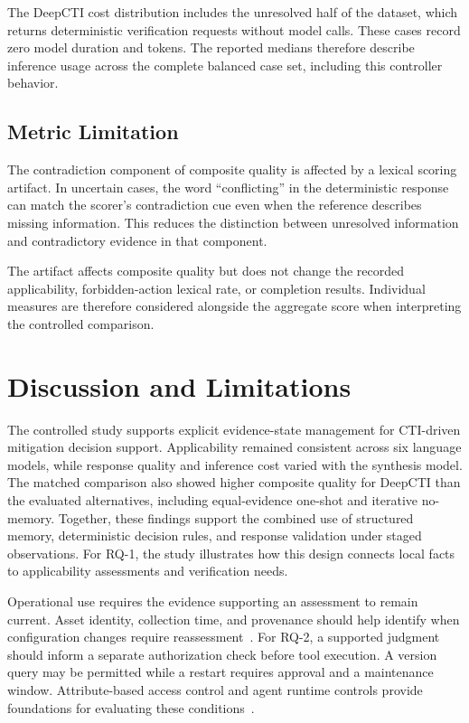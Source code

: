 \documentclass[conference]{IEEEtran}
\begin{document}
The DeepCTI cost distribution includes the unresolved half of the
dataset, which returns deterministic verification requests without
model calls. These cases record zero model duration and tokens.
The reported medians therefore describe inference usage across
the complete balanced case set, including this controller behavior.

\subsection{Metric Limitation}
\label{sec:metric-limitation}

The contradiction component of composite quality is affected by a
lexical scoring artifact. In uncertain cases, the word
``conflicting'' in the deterministic response can match the
scorer's contradiction cue even when the reference describes missing
information. This reduces the distinction between unresolved
information and contradictory evidence in that component.

The artifact affects composite quality but does not change the
recorded applicability, forbidden-action lexical rate, or completion
results. Individual measures are therefore considered alongside
the aggregate score when interpreting the controlled comparison.

\section{Discussion and Limitations}

The controlled study supports explicit evidence-state management for
CTI-driven mitigation decision support. Applicability remained consistent
across six language models, while response quality and inference cost
varied with the synthesis model. The matched comparison also showed
higher composite quality for DeepCTI than the evaluated alternatives,
including equal-evidence one-shot and iterative no-memory. Together,
these findings support the combined use of structured memory,
deterministic decision rules, and response validation under staged
observations. For RQ-1, the study illustrates how this design connects
local facts to applicability assessments and verification needs.

Operational use requires the evidence supporting an assessment to
remain current. Asset identity, collection time, and provenance should
help identify when configuration changes require
reassessment~\cite{johnson2011configuration,dempsey2011monitoring}.
For RQ-2, a supported judgment should inform a separate authorization
check before tool execution. A version query may be permitted while
a restart requires approval and a maintenance window. Attribute-based
access control and agent runtime controls provide foundations for
evaluating these conditions~\cite{hu2014abac,shi2025progent,wang2026agentspec}.
\end{document}
